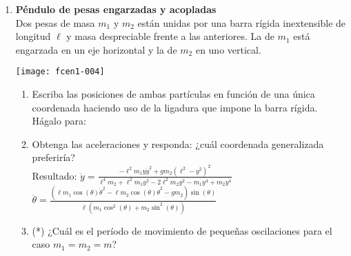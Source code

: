 \documentclass[11pt, spanish, a4paper, twoside]{article}
\begin{document}
\begin{enumerate}
	\item 
	\begin{minipage}[t][1.5cm]{0.7\textwidth}
		\textbf{Péndulo de pesas engarzadas y acopladas}\\ 
		Dos pesas de masa \(m_1\) y \(m_2\) están unidas por una barra rígida inextensible de longitud \(\ell\) y masa despreciable frente a las anteriores.
		La de \(m_1\) está engarzada en un eje horizontal y la de \(m_2\) en uno vertical.
	\end{minipage}
	\begin{minipage}[c][2cm][t]{0.3\textwidth}
		\texttt{[image: fcen1-004]}
	\end{minipage}
	\begin{enumerate}
		\item Escriba las posiciones de ambas partículas en función de una única coordenada haciendo uso de la ligadura que impone la barra rígida.
		Hágalo para:
		\item Obtenga las aceleraciones y responda: ¿cuál coordenada generalizada preferiría?\\
		Resultado:
			$\ddot{y} = \frac{- \ell^{2} m_{1} y \dot{y}^{2} + g m_{2} \left(\ell^{2} - y^{2}\right)^{2}}{\ell^{4} m_{2} + \ell^{2} m_{1} y^{2} - 2 \ell^{2} m_{2} y^{2} - m_{1} y^{4} + m_{2} y^{4}}$
			\qquad
			$\ddot{\theta} = \frac{\left(\ell m_{1} \cos{\left(\theta \right)} \dot{\theta}^{2} - \ell m_{2} \cos{\left(\theta \right)} \dot{\theta}^{2} - g m_{2}\right) \sin{\left(\theta \right)}}{\ell \left(m_{1} \cos^{2}{\left(\theta \right)} + m_{2} \sin^{2}{\left(\theta \right)}\right)}$
		\item (*) ¿Cuál es el período de movimiento de pequeñas oscilaciones para el caso \(m_1 = m_2 = m\)?
	\end{enumerate}




\end{enumerate}
\end{document}
